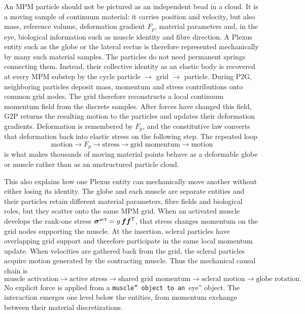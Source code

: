 \documentclass[11pt]{article}
\newcommand{\vect}[1]{\bm{#1}}
\begin{document}
An MPM particle should not be pictured as an independent bead in a cloud. It is a moving sample of continuum material: it carries position and velocity, but also mass, reference volume, deformation gradient $F_p$, material parameters and, in the eye, biological information such as muscle identity and fibre direction. A Plexus entity such as the globe or the lateral rectus is therefore represented mechanically by many such material samples. The particles do not need permanent springs connecting them. Instead, their collective identity as an elastic body is recovered at every MPM substep by the cycle particle $\rightarrow$ grid $\rightarrow$ particle. During P2G, neighboring particles deposit mass, momentum and stress contributions onto common grid nodes. The grid therefore reconstructs a local continuum momentum field from the discrete samples. After forces have changed this field, G2P returns the resulting motion to the particles and updates their deformation gradients. Deformation is remembered by $F_p$, and the constitutive law converts that deformation back into elastic stress on the following step. The repeated loop
\begin{equation}
\text{motion}\rightarrow F_p\rightarrow\text{stress}\rightarrow\text{grid momentum}\rightarrow\text{motion}
\label{eq:auto19}
\end{equation}
is what makes thousands of moving material points behave as a deformable globe or muscle rather than as an unstructured particle cloud.

This also explains how one Plexus entity can mechanically move another without either losing its identity. The globe and each muscle are separate entities and their particles retain different material parameters, fibre fields and biological roles, but they scatter onto the same MPM grid. When an activated muscle develops the rank-one stress $\boldsymbol{\sigma}^{\rm act}=g\,\vect f\vect f^{\mathsf T}$, that stress changes momentum on the grid nodes supporting the muscle. At the insertion, scleral particles have overlapping grid support and therefore participate in the same local momentum update. When velocities are gathered back from the grid, the scleral particles acquire motion generated by the contracting muscle. Thus the mechanical causal chain is
\begin{equation}
\text{muscle activation}\rightarrow
\text{active stress}\rightarrow
\text{shared grid momentum}\rightarrow
\text{scleral motion}\rightarrow
\text{globe rotation}.
\label{eq:auto20}
\end{equation}
No explicit force is applied from a \texttt{muscle'' object to an }eye'' object. The interaction emerges one level below the entities, from momentum exchange between their material discretizations.
\end{document}
